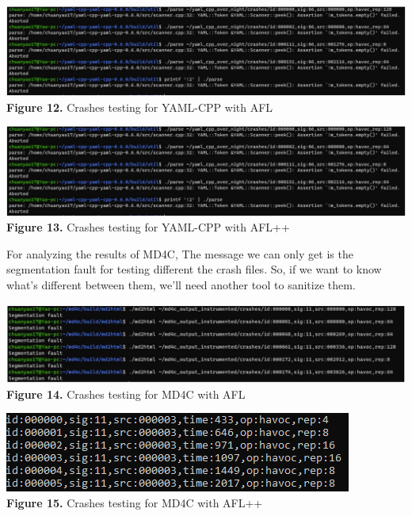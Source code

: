 \documentclass[12pt]{diazessay}
\begin{document}
\vspace{3mm}
\begin{center}
	\includegraphics[scale=0.35, trim={0 0 0 0}, clip]{yaml_cpp_crashes.png}\\
	\textbf{Figure 12.} Crashes testing for YAML-CPP with AFL
\end{center}
\vspace{3mm}

\vspace{6mm}
\begin{center}
	\includegraphics[scale=0.45, trim={0 3cm 0 0}, clip]{yaml_cpp_crashes.png}\\
	\textbf{Figure 13.} Crashes testing for YAML-CPP with AFL++
\end{center}

For analyzing the results of MD4C, The message we can only get is the segmentation fault for testing different the crash files. So, if we want to know what's different between them, we'll need another tool to sanitize them.

\vspace{6mm}
\begin{center}
	\includegraphics[scale=0.35, trim={0 0 1cm 0}, clip]{md4c_crashes.png}
	\textbf{Figure 14.} Crashes testing for MD4C with AFL
\end{center}
\vspace{3mm}

\begin{center}
	\includegraphics[scale=1.0]{markdowncrashes.png}\\
	\textbf{Figure 15.} Crashes testing for MD4C with AFL++
\end{center}
\end{document}
